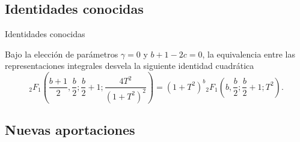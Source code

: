 \documentclass[xcolor=dvipsnames,10pt]{beamer}
\begin{document}
\subsection{Identidades conocidas}

\begin{frame}{Identidades conocidas}

    Bajo la elección de parámetros $\gamma = 0$ y $b+1-2c = 0$, la equivalencia entre las representaciones integrales desvela la siguiente identidad cuadrática
    \vspace{-0.1cm}
    \[
    {}_{2}F_{1}\left(\frac{b+1}{2}, \frac{b}{2}; \frac{b}{2}+1; \frac{4T^2}{(1+T^2)^2}\right) = (1+T^2)^b {}_{2}F_{1}\left(b, \frac{b}{2}; \frac{b}{2}+1; T^2\right).
    \]

    \vspace{-0.2cm}
\end{frame}

\subsection{Nuevas aportaciones}
\end{document}
